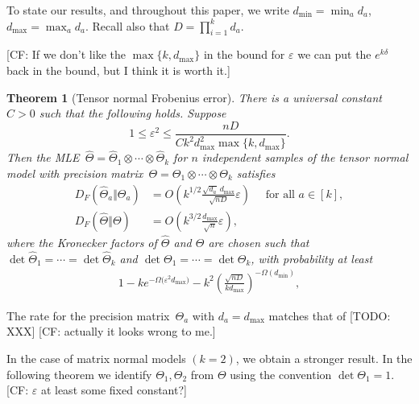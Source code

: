 \documentclass[aos]{imsart}
\newtheorem{theorem}{Theorem}[section]
\theoremstyle{definition}
\numberwithin{equation}{section}
\DeclareMathOperator{\op}{op}
\newcommand{\htheta}{\widehat{\Theta}}
\newcommand{\ot}{\otimes}
\newcommand{\eps}{\varepsilon}
\newcommand{\CF}[1]{{\color{purple}[CF: #1]}}
\newcommand{\TODO}[1]{{\color{blue}[TODO: #1]}}
\begin{document}
To state our results, and throughout this paper, we write $d_{\min} = \min_a d_a$, $d_{\max} = \max_a d_a$.
Recall also that $D = \prod_{i=1}^k d_a$.

\CF{If we don't like the $\max\{k, d_{\max}\}$ in the bound for $\eps$ we can put the $e^{k \delta}$ back in the bound, but I think it is worth it.}

\newcommand{\TensorFrob}[2]{%
There is a universal constant~$C>0$ such that the following holds.
Suppose
\begin{#1}#2
  1 \leq \eps^2 \leq \frac{nD}{C k^2 d_{\max}^2 \max\{k, d_{\max}\}}.
\end{#1}
Then the MLE~$\htheta = \htheta_1 \ot \cdots \ot \htheta_k$ for $n$ independent samples of the tensor normal model with precision matrix~$\Theta = \Theta_1 \ot \cdots \ot \Theta_k$ satisfies
\begin{align*}
  D_F(\htheta_a\Vert\Theta_a) &= O\left(k^{1/2} \frac{\sqrt{d_a} \, d_{\max}}{\sqrt{n D}} \eps\right) \quad\text{ for all } a\in[k], \\
  D_F(\htheta\Vert\Theta) &= O\left(k^{3/2} \frac{d_{\max}}{\sqrt{n}} \eps\right),
\end{align*}
where the Kronecker factors of $\htheta$ and $\Theta$ are chosen such that $\det\htheta_1 = \cdots = \det\htheta_k$ and $\det\Theta_1 = \cdots = \det\Theta_k$, with probability at least
\begin{align*}
  1 - k e^{-\Omega\bigl( \eps^2 d_{\max} \bigr)} - k^2 \left( \frac{\sqrt{nD}}{k d_{\max}} \right)^{-\Omega(d_{\min})},
\end{align*}}

\begin{theorem}[Tensor normal Frobenius error]\label{thm:tensor-frobenius}
\TensorFrob{equation}{\label{eq:eps sqr assm}}
\end{theorem}

The rate for the precision matrix~$\Theta_a$ with $d_a = d_{\max}$ matches that of \TODO{XXX} \CF{actually it looks wrong to me.}

In the case of matrix normal models $(k=2)$, we obtain a stronger result. In the following theorem we identify $\Theta_1, \Theta_2$ from $\Theta$ using the convention $\det \Theta_1 = 1$.
\CF{$\eps$ at least some fixed constant?}

\newcommand{\MatrixSpec}{%
There is a universal constant~$C>0$ with the following property.
Suppose $d_1 \leq d_2$ and $n \geq C \frac{d_2}{d_1} \max \{\log \frac{d_2}{d_1},  \frac{\log^2 d_1}{\eps^2}\}$.

Then the MLE $\htheta = \htheta_1 \ot \htheta_2$ for $n$ independent samples from the matrix normal model with precision matrix $\Theta = \Theta_1 \ot \Theta_2$ satisfies
\begin{align*}
  D_{\op}(\widehat{\Theta}_1 \Vert \Theta_1) = O\left(\eps \sqrt{\frac{d_1}{nd_2}} \log d_1\right)
\quad\text{and}\quad
D_{\op}(\widehat{\Theta}_2 \Vert \Theta_2) = O\left(\eps \sqrt{\frac{d_2}{nd_1}}\right),
\end{align*}
where the Kronecker factors of $\htheta$ and $\Theta$ are chosen such that $\det\htheta_1 = \det\htheta_2$ and $\det\Theta_1 = \det\Theta_2$, with probability at least  $1 - O(e^{ - \Omega( d_1 \eps^2)})$.}
\end{document}
